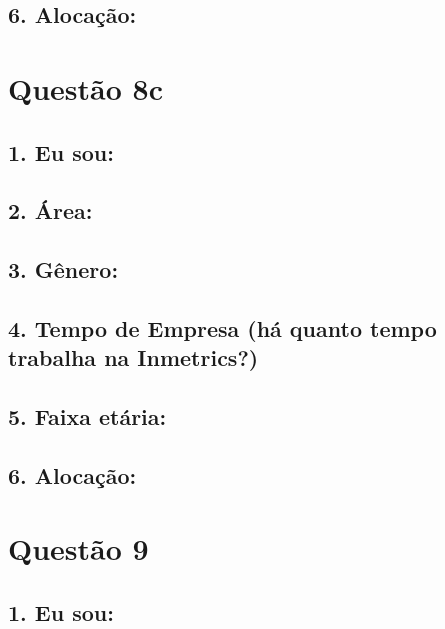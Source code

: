 \documentclass[]{book}
\begin{document}
\hypertarget{alocacao-1}{%
\subsection{6. Alocação:}\label{alocacao-1}}

\hypertarget{questao-8c}{%
\section{Questão 8c}\label{questao-8c}}

\hypertarget{eu-sou-2}{%
\subsection{1. Eu sou:}\label{eu-sou-2}}

\hypertarget{area-2}{%
\subsection{2. Área:}\label{area-2}}

\hypertarget{genero-2}{%
\subsection{3. Gênero:}\label{genero-2}}

\hypertarget{tempo-de-empresa-ha-quanto-tempo-trabalha-na-inmetrics-2}{%
\subsection{4. Tempo de Empresa (há quanto tempo trabalha na Inmetrics?)}\label{tempo-de-empresa-ha-quanto-tempo-trabalha-na-inmetrics-2}}

\hypertarget{faixa-etaria-2}{%
\subsection{5. Faixa etária:}\label{faixa-etaria-2}}

\hypertarget{alocacao-2}{%
\subsection{6. Alocação:}\label{alocacao-2}}

\hypertarget{questao-9}{%
\section{Questão 9}\label{questao-9}}

\hypertarget{eu-sou-3}{%
\subsection{1. Eu sou:}\label{eu-sou-3}}
\end{document}
